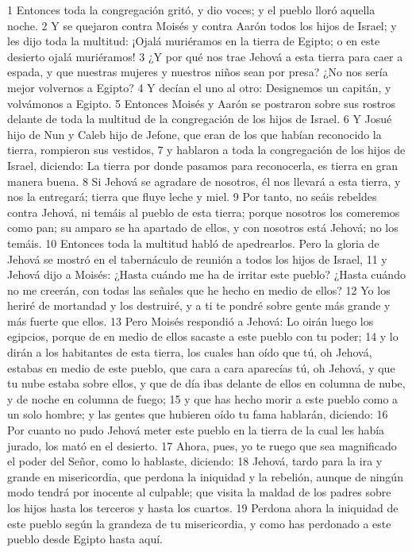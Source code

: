 1 Entonces toda la congregación gritó, y dio voces; y el pueblo lloró aquella noche.
2 Y se quejaron contra Moisés y contra Aarón todos los hijos de Israel; y les dijo toda la multitud: ¡Ojalá muriéramos en la tierra de Egipto; o en este desierto ojalá muriéramos!
3 ¿Y por qué nos trae Jehová a esta tierra para caer a espada, y que nuestras mujeres y nuestros niños sean por presa? ¿No nos sería mejor volvernos a Egipto?
4 Y decían el uno al otro: Designemos un capitán, y volvámonos a Egipto.
5 Entonces Moisés y Aarón se postraron sobre sus rostros delante de toda la multitud de la congregación de los hijos de Israel.
6 Y Josué hijo de Nun y Caleb hijo de Jefone, que eran de los que habían reconocido la tierra, rompieron sus vestidos,
7 y hablaron a toda la congregación de los hijos de Israel, diciendo: La tierra por donde pasamos para reconocerla, es tierra en gran manera buena.
8 Si Jehová se agradare de nosotros, él nos llevará a esta tierra, y nos la entregará; tierra que fluye leche y miel.
9 Por tanto, no seáis rebeldes contra Jehová, ni temáis al pueblo de esta tierra; porque nosotros los comeremos como pan; su amparo se ha apartado de ellos, y con nosotros está Jehová; no los temáis.
10 Entonces toda la multitud habló de apedrearlos. Pero la gloria de Jehová se mostró en el tabernáculo de reunión a todos los hijos de Israel,
11 y Jehová dijo a Moisés: ¿Hasta cuándo me ha de irritar este pueblo? ¿Hasta cuándo no me creerán, con todas las señales que he hecho en medio de ellos?
12 Yo los heriré de mortandad y los destruiré, y a ti te pondré sobre gente más grande y más fuerte que ellos.
13 Pero Moisés respondió a Jehová: Lo oirán luego los egipcios, porque de en medio de ellos sacaste a este pueblo con tu poder;
14 y lo dirán a los habitantes de esta tierra, los cuales han oído que tú, oh Jehová, estabas en medio de este pueblo, que cara a cara aparecías tú, oh Jehová, y que tu nube estaba sobre ellos, y que de día ibas delante de ellos en columna de nube, y de noche en columna de fuego;
15 y que has hecho morir a este pueblo como a un solo hombre; y las gentes que hubieren oído tu fama hablarán, diciendo:
16 Por cuanto no pudo Jehová meter este pueblo en la tierra de la cual les había jurado, los mató en el desierto.
17 Ahora, pues, yo te ruego que sea magnificado el poder del Señor, como lo hablaste, diciendo: 
18 Jehová, tardo para la ira y grande en misericordia, que perdona la iniquidad y la rebelión, aunque de ningún modo tendrá por inocente al culpable; que visita la maldad de los padres sobre los hijos hasta los terceros y hasta los cuartos.
19 Perdona ahora la iniquidad de este pueblo según la grandeza de tu misericordia, y como has perdonado a este pueblo desde Egipto hasta aquí. 
